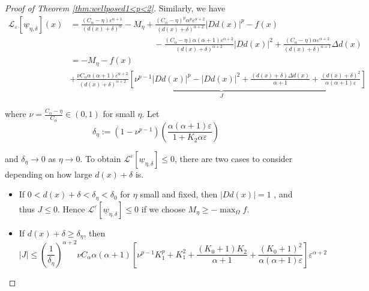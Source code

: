 \documentclass[12pt,reqno]{amsart}
\numberwithin{figure}{section}
\theoremstyle{plain}
\theoremstyle{remark}
\numberwithin{equation}{section}
\begin{document}
\begin{proof} [Proof of Theorem \ref{thm:wellposed1<p<2}]
Similarly, we have 
\begin{align*}
    \mathcal{L}_\varepsilon\left[\underline{w}_{\eta,\delta}\right](x) &= \frac{ (C_\alpha - \eta)\varepsilon^{\alpha+1}}{(d(x)+\delta)^\alpha} - M_\eta + \frac{(C_\alpha-\eta)^p \alpha^p\varepsilon^{\alpha+2}}{(d(x)+\delta)^{\alpha+2}}|D d(x)|^p - f(x) \\
    & \qquad\qquad\qquad\qquad\qquad - \frac{(C_\alpha-\eta)\alpha(\alpha+1)\varepsilon^{\alpha+2}}{(d(x)+\delta)^{\alpha+2}}|D d(x)|^2 + \frac{(C_\alpha-\eta)\alpha \varepsilon^{\alpha+2}}{(d(x)+\delta)^{\alpha+1}}\Delta d(x)\\
    &= - M_\eta - f(x) \\
    &+\underbrace{\frac{\nu C_\alpha\alpha(\alpha+1)\varepsilon^{\alpha+2}}{(d(x)+\delta)^{\alpha+2}}\left[\nu^{p-1}|Dd(x)|^{p} - |Dd(x)|^2 + \frac{(d(x)+\delta)\Delta d(x)}{\alpha+1}+\frac{(d(x)+\delta)^2}{\alpha(\alpha+1)\varepsilon}\right]}_{J}
\end{align*}

where $\nu = \frac{C_\alpha-\eta}{C_\alpha}\in (0,1)$ for small $\eta$. Let
\begin{equation*}
    \delta_\eta := \left(1-\nu^{p-1}\right)\left(\frac{\alpha(\alpha+1)\varepsilon}{1+K_2\alpha\varepsilon}\right) 
\end{equation*}

and $\delta_\eta \to 0$ as $ \eta \to 0$.
To obtain $\mathcal{L}^\varepsilon\left[\underline{w}_{\eta,\delta}\right]\leq 0$, there are two cases to consider depending on how large $d(x)+\delta$ is.
\begin{itemize}
    \item If $0<d(x)+\delta<\delta_\eta < \delta_0$ for $\eta$ small and fixed, then $|Dd(x)| = 1$ , and thus $J\leq 0$. Hence $\mathcal{L}^\varepsilon\left[\underline{w}_{\eta,\delta}\right]\leq 0$ if we choose $M_\eta \geq -\max_{\Omega}f$.
    \item If $d(x)+\delta\geq \delta_\eta$, then
    \begin{equation*}
        |J|\leq \left(\frac{1}{\delta_\eta}\right)^{\alpha+2} \nu C_\alpha\alpha(\alpha+1)\left[\nu^{p-1}K_1^{p}+K_1^2 + \frac{(K_0+1)K_2}{\alpha+1} + \frac{(K_0+1)^2}{\alpha(\alpha+1)\varepsilon}\right]\varepsilon^{\alpha+2}
    \end{equation*}
    

\end{itemize}
\end{proof}
\end{document}
